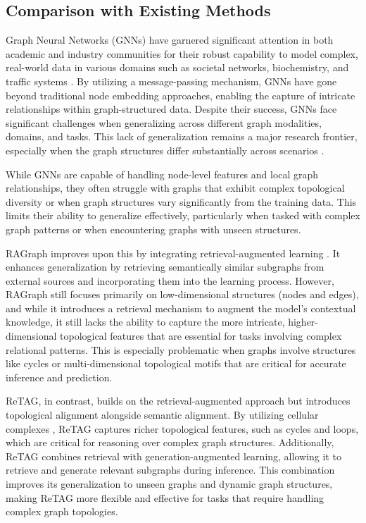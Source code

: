 \subsection{Comparison with Existing Methods}

Graph Neural Networks (GNNs) have garnered significant attention in both academic and industry communities for their robust capability to model complex, real-world data in various domains such as societal networks, biochemistry, and traffic systems \cite{Fang2025,Fang2023,Gao2023,Li2022}. By utilizing a message-passing mechanism, GNNs have gone beyond traditional node embedding approaches, enabling the capture of intricate relationships within graph-structured data. Despite their success, GNNs face significant challenges when generalizing across different graph modalities, domains, and tasks. This lack of generalization remains a major research frontier, especially when the graph structures differ substantially across scenarios \cite{Asai2023,Asai2024,Izacard2022}. 

While GNNs are capable of handling node-level features and local graph relationships, they often struggle with graphs that exhibit complex topological diversity or when graph structures vary significantly from the training data. This limits their ability to generalize effectively, particularly when tasked with complex graph patterns or when encountering graphs with unseen structures.

RAGraph improves upon this by integrating retrieval-augmented learning \cite{JiangQXZZ00X0W24}. It enhances generalization by retrieving semantically similar subgraphs from external sources and incorporating them into the learning process. However, RAGraph still focuses primarily on low-dimensional structures (nodes and edges), and while it introduces a retrieval mechanism to augment the model's contextual knowledge, it still lacks the ability to capture the more intricate, higher-dimensional topological features that are essential for tasks involving complex relational patterns. This is especially problematic when graphs involve structures like cycles or multi-dimensional topological motifs that are critical for accurate inference and prediction.

ReTAG, in contrast, builds on the retrieval-augmented approach but introduces topological alignment alongside semantic alignment. By utilizing cellular complexes \cite{hajij2020cell}, ReTAG captures richer topological features, such as cycles and loops, which are critical for reasoning over complex graph structures. Additionally, ReTAG combines retrieval with generation-augmented learning, allowing it to retrieve and generate relevant subgraphs during inference. This combination improves its generalization to unseen graphs and dynamic graph structures, making ReTAG more flexible and effective for tasks that require handling complex graph topologies.

